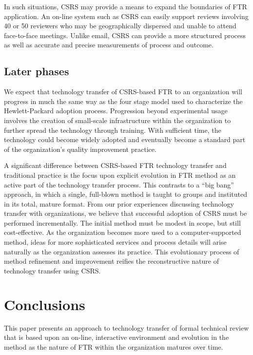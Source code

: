 In such situations, CSRS may provide a means to expand the boundaries of
FTR application.  An on-line system such as CSRS can easily support reviews
involving 40 or 50 reviewers who may be geographically dispersed and unable
to attend face-to-face meetings.  Unlike email, CSRS can provide a more
structured process as well as accurate and precise measurements of process
and outcome.


\subsection{Later phases}

We expect that technology transfer of CSRS-based FTR to an organization
will progress in much the same way as the four stage model used to
characterize the Hewlett-Packard adoption process.  Progression beyond
experimental usage involves the creation of small-scale infrastructure
within the organization to further spread the technology through training.
With sufficient time, the technology could become widely adopted and
eventually become a standard part of the organization's quality improvement
practice.

A significant difference between CSRS-based FTR technology transfer and
traditional practice is the focus upon explicit evolution in FTR method as
an active part of the technology transfer process.  This contrasts to a
``big bang'' approach, in which a single, full-blown method is taught to
groups and instituted in its total, mature format.  From our prior
experiences discussing technology transfer with organizations, we believe
that successful adoption of CSRS must be performed incrementally.  The
initial method must be modest in scope, but still cost-effective.  As
the organization becomes more used to a computer-supported method, ideas
for more sophisticated services and process details will arise naturally as
the organization assesses its practice.  This evolutionary process of 
method refinement and improvement reifies the reconstructive nature of 
technology transfer using CSRS. 

\section{Conclusions}

This paper presents an approach to technology transfer of formal technical
review that is based upon an on-line, interactive environment and evolution
in the method as the nature of FTR within the organization matures over
time.

